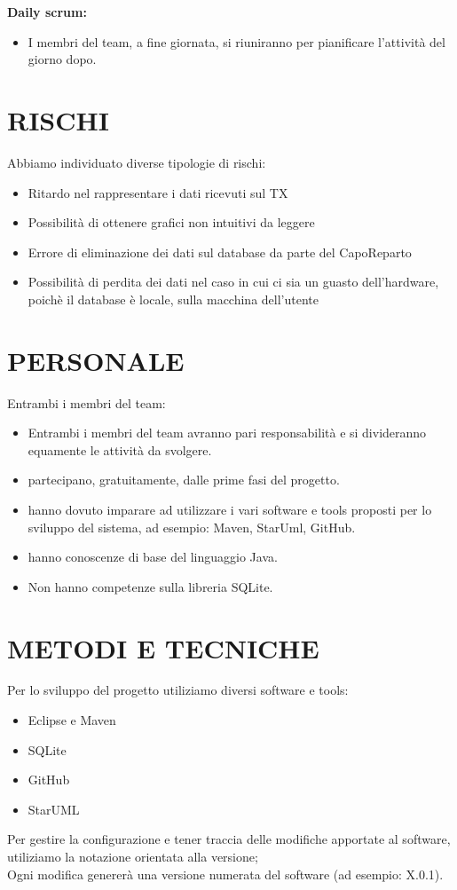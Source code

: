 \documentclass{report}
\begin{document}
\textbf{Daily scrum:}\\
\begin{itemize}
\item I membri del team, a fine giornata, si riuniranno per pianificare l'attività del giorno dopo.
\end{itemize}


\chapter{RISCHI}
Abbiamo individuato diverse tipologie di rischi:
\begin{itemize}
\item Ritardo nel rappresentare i dati ricevuti sul TX
\item Possibilità di ottenere grafici non intuitivi da leggere
\item Errore di eliminazione dei dati sul database da parte del CapoReparto
\item Possibilità di perdita dei dati nel caso in cui ci sia un guasto dell'hardware, poichè il database è locale, sulla macchina dell'utente
\end{itemize}

\begingroup
\let\clearpage\relax
\chapter{PERSONALE}
\endgroup
Entrambi i membri del team:
\begin{itemize}
\item Entrambi i membri del team avranno pari responsabilità e si divideranno equamente le attività da svolgere.
\item partecipano, gratuitamente, dalle prime fasi del progetto.
\item hanno dovuto imparare ad utilizzare i vari software e tools proposti per lo sviluppo del sistema, ad esempio:
 Maven, StarUml, GitHub.
\item hanno conoscenze di base del linguaggio Java.
\item Non hanno competenze sulla libreria SQLite.
\end{itemize}

\chapter{METODI E TECNICHE}
Per lo sviluppo del progetto utiliziamo diversi software e tools:
\begin{itemize}
\item Eclipse e Maven
\item SQLite
\item GitHub
\item StarUML
\end{itemize}
Per gestire la configurazione e tener traccia delle modifiche apportate al software, utiliziamo la notazione orientata alla versione;\\
Ogni modifica genererà una versione numerata del software (ad esempio: X.0.1).
\end{document}
